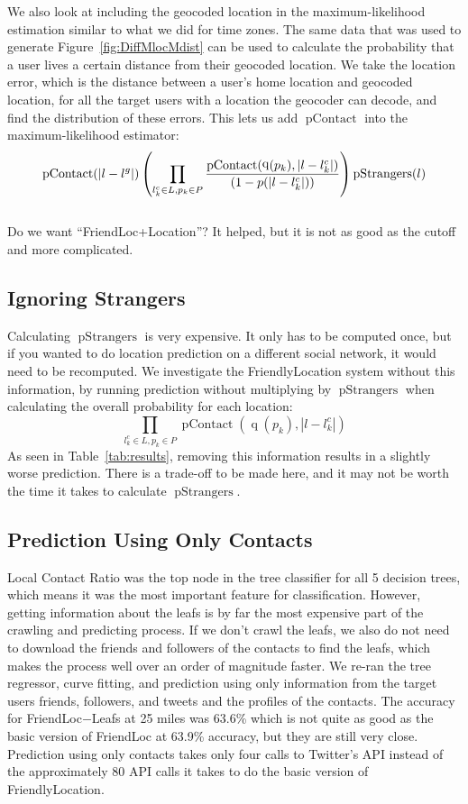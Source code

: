 \documentclass[letterpaper]{article}
\DeclareMathOperator{\pContact}{pContact}
\DeclareMathOperator{\pLocation}{pContact}
\DeclareMathOperator{\pStrangers}{pStrangers}
\DeclareMathOperator{\quantile}{q}
\begin{document}
We also look at including the geocoded location in the maximum-likelihood
estimation similar to what we did for time zones.
%
The same data that was used to generate Figure~\ref{fig:DiffMlocMdist} can be
used to calculate the probability that a user lives a certain distance from
their geocoded location.
%
We take the location error, which is the distance between a user's home
location and geocoded location, for all the target users with a location the
geocoder can decode, and find the distribution of these errors.
%
This lets us add $\pLocation$ into the maximum-likelihood estimator:
\[
    \pLocation(|l-l^g|)
    \left(
        \prod_{l^c_k \in L,p_k \in P}
        {\pContact(\quantile(p_k),|l-l^c_k|) \over (1-p(|l-l^c_k|))}
    \right)
    \pStrangers(l)
\]
\\{Do we want ``FriendLoc+Location''? It helped, but it is not as good as the
    cutoff and more complicated.}

\fi

\subsection{Ignoring Strangers}
Calculating $\pStrangers$ is very expensive.
%
It only has to be computed once, but if you wanted to do location prediction on
a different social network, it would need to be recomputed.
%
We investigate the FriendlyLocation system without this information, by running
prediction without multiplying by $\pStrangers$ when calculating the overall
probability for each location:
\[
    \prod_{l^c_k \in L,p_k \in P} \pContact(\quantile(p_k),|l-l^c_k|)
\]
As seen in Table~\ref{tab:results}, removing this information results in a
slightly worse prediction.
%
There is a trade-off to be made here, and it may not be worth the time it takes
to calculate $\pStrangers$.

\subsection{Prediction Using Only Contacts}
Local Contact Ratio was the top node in the tree classifier for all 5 decision
trees, which means it was the most important feature for classification.
%
However, getting information about the leafs is by far the most expensive part
of the crawling and predicting process.
%
If we don't crawl the leafs, we also do not need to download the friends and
followers of the contacts to find the leafs, which makes the process well over
an order of magnitude faster.
%
We re-ran the tree regressor, curve fitting, and prediction using only
information from the target users friends, followers, and tweets and the
profiles of the contacts.
%
The accuracy for FriendLoc$-$Leafs at 25 miles was 63.6\% which is not quite as
good as the basic version of FriendLoc at 63.9\% accuracy, but they are still
very close.
%
Prediction using only contacts takes only four calls to Twitter's API instead
of the approximately 80 API calls it takes to do the basic version of
FriendlyLocation.
\end{document}

